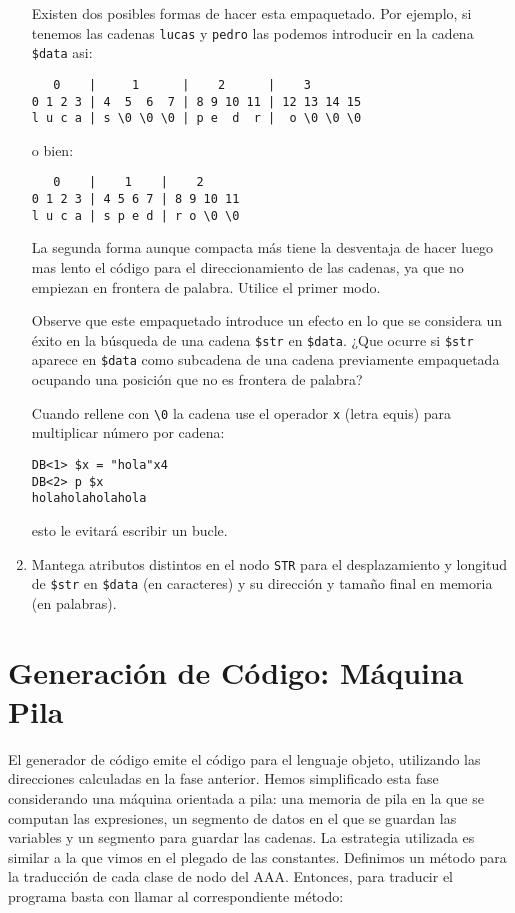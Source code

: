 \begin{enumerate}
Existen dos posibles formas de hacer esta empaquetado.
Por ejemplo, si tenemos las cadenas
\verb|lucas| y \verb|pedro| las podemos introducir en 
la cadena \verb|$data| asi:

\begin{center}
\begin{verbatim}
   0    |     1      |    2      |    3
0 1 2 3 | 4  5  6  7 | 8 9 10 11 | 12 13 14 15
l u c a | s \0 \0 \0 | p e  d  r |  o \0 \0 \0
\end{verbatim}
\end{center}

o bien:

\begin{center}
\begin{verbatim}
   0    |    1    |    2     
0 1 2 3 | 4 5 6 7 | 8 9 10 11
l u c a | s p e d | r o \0 \0
\end{verbatim}
\end{center}

La segunda forma aunque compacta más tiene la desventaja de hacer luego mas 
lento el código para el 
direccionamiento de las cadenas, ya que no empiezan en frontera de palabra. 
Utilice el primer modo.

Observe que este empaquetado introduce un efecto en lo que 
se considera un éxito en la búsqueda de una cadena 
\verb|$str| en \verb|$data|. ¿Que ocurre si \verb|$str|
aparece en \verb|$data| como subcadena de una cadena
previamente empaquetada ocupando una posición que no es frontera de palabra?

Cuando rellene con \verb|\0| la cadena use el operador \verb|x| (letra equis)
para multiplicar número por cadena:

\begin{verbatim}
DB<1> $x = "hola"x4
DB<2> p $x
holaholaholahola
\end{verbatim}

esto le evitará escribir un bucle.
\item
Mantega atributos distintos en el nodo \verb|STR|
para el desplazamiento y longitud 
de \verb|$str| en \verb|$data| (en caracteres)
y su dirección y tamaño final en memoria (en palabras).

\end{enumerate}

\section{Generación de Código: Máquina Pila}
\label{section:pila}
El generador de código emite el código para el lenguaje objeto, utilizando
las direcciones calculadas en la fase anterior. Hemos simplificado esta fase
considerando una máquina orientada a pila: una memoria de pila en la que se
computan las expresiones, un segmento de datos en el que se guardan las variables
y un segmento para guardar las cadenas.
La estrategia utilizada es similar a la que vimos en el plegado de las constantes.
Definimos un método para la traducción de cada clase de nodo del AAA.
Entonces, para traducir el programa basta con llamar al correspondiente método:


